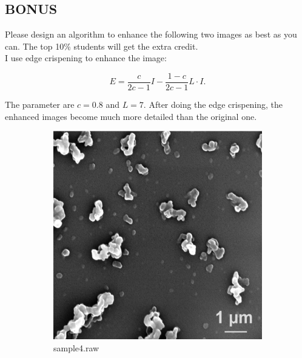 \documentclass{article}
\begin{document}
\newpage
\subsection*{BONUS}

Please design an algorithm to enhance the following two images as best as you can. The top 10\% students will get the extra credit. \\

I use edge crispening to enhance the image:

$$E = \frac{c}{2c - 1} I - \frac{1 - c}{2c - 1}L \cdot I.$$

The parameter are $c = 0.8$ and $L = 7$. After doing the edge crispening, the enhanced images become much more detailed than the original one.

\begin{figure}[!htb]
    \centering
    \begin{subfigure}[b]{0.3\textwidth}
        \includegraphics[width=\textwidth]{img/I4.png}
        \caption{sample4.raw}
    \end{subfigure}
    ~
    \begin{subfigure}[b]{0.3\textwidth}

\end{subfigure}
\end{figure}
\end{document}
